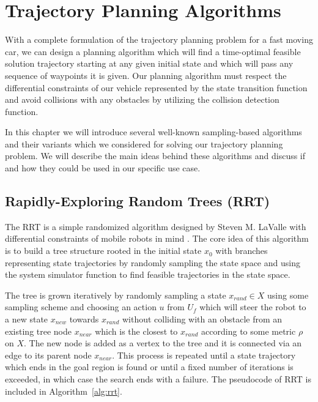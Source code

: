 \section{Trajectory Planning Algorithms}
\label{sec:trajectory_planning_algorithms}

With a complete formulation of the trajectory planning problem for a fast moving car, we can design a planning algorithm which will find a time-optimal feasible solution trajectory starting at any given initial state and which will pass any sequence of waypoints it is given. Our planning algorithm must respect the differential constraints of our vehicle represented by the state transition function and avoid collisions with any obstacles by utilizing the collision detection function.

In this chapter we will introduce several well-known sampling-based algorithms and their variants which we considered for solving our trajectory planning problem. We will describe the main ideas behind these algorithms and discuss if and how they could be used in our specific use case.

\subsection{Rapidly-Exploring Random Trees (RRT)}

The \gls{RRT} is a simple randomized algorithm designed by Steven M. LaValle with differential constraints of mobile robots in mind \cite{RRT}. The core idea of this algorithm is to build a tree structure rooted in the initial state $x_0$ with branches representing state trajectories by randomly sampling the state space and using the system simulator function to find feasible trajectories in the state space.

The tree is grown iteratively by randomly sampling a state $x_{rand}\in X$ using some sampling scheme and choosing an action $u$ from $U_f$ which will steer the robot to a new state $x_{new}$ towards $x_{rand}$ without colliding with an obstacle from an existing tree node $x_{near}$ which is the closest to $x_{rand}$ according to some metric $\rho$ on $X$. The new node is added as a vertex to the tree and it is connected via an edge to its parent node $x_{near}$. This process is repeated until a state trajectory which ends in the goal region is found or until a fixed number of iterations is exceeded, in which case the search ends with a failure. The pseudocode of RRT is included in Algorithm~\ref{alg:rrt}.

